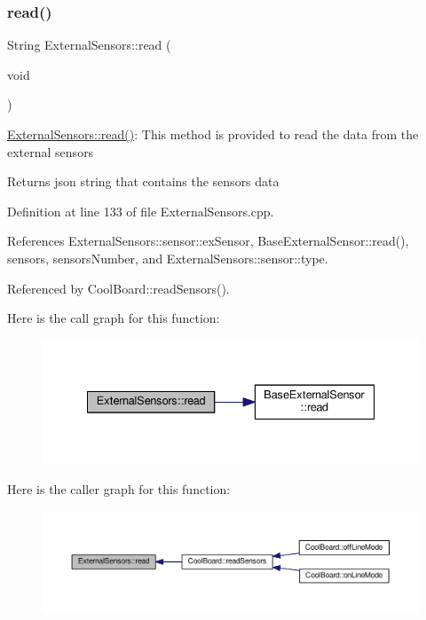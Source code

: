 \subsubsection{\texorpdfstring{read()}{read()}}
{\footnotesize\ttfamily String External\+Sensors\+::read (\begin{DoxyParamCaption}\item[{void}]{ }\end{DoxyParamCaption})}

\hyperlink{class_external_sensors_a53177b81eca3be89508b5511ddcd00fc}{External\+Sensors\+::read()}\+: This method is provided to read the data from the external sensors

\begin{DoxyReturn}{Returns}
json string that contains the sensors data 
\end{DoxyReturn}


Definition at line 133 of file External\+Sensors.\+cpp.



References External\+Sensors\+::sensor\+::ex\+Sensor, Base\+External\+Sensor\+::read(), sensors, sensors\+Number, and External\+Sensors\+::sensor\+::type.



Referenced by Cool\+Board\+::read\+Sensors().

Here is the call graph for this function\+:\nopagebreak
\begin{figure}[H]
\begin{center}
\leavevmode
\includegraphics[width=335pt]{d1/d2f/class_external_sensors_a53177b81eca3be89508b5511ddcd00fc_cgraph}
\end{center}
\end{figure}
Here is the caller graph for this function\+:\nopagebreak
\begin{figure}[H]
\begin{center}
\leavevmode
\includegraphics[width=350pt]{d1/d2f/class_external_sensors_a53177b81eca3be89508b5511ddcd00fc_icgraph}
\end{center}
\end{figure}
\mbox{\label{class_external_sensors_a862a4bd11346b37270d0244c2adabe5a}} 
